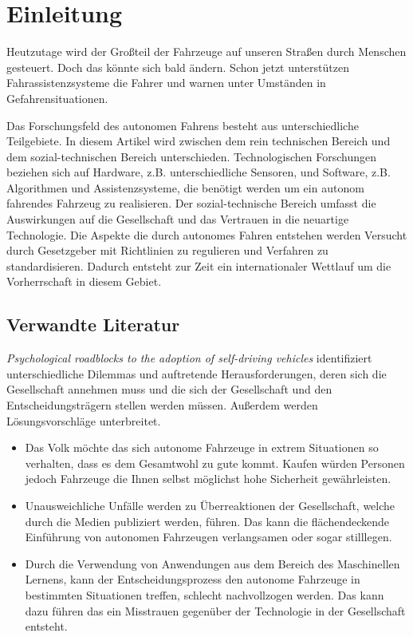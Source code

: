 \section{Einleitung}

Heutzutage wird der Großteil der Fahrzeuge auf unseren Straßen durch Menschen gesteuert. Doch das könnte sich bald ändern. Schon jetzt unterstützen Fahrassistenzsysteme die Fahrer und warnen unter Umständen in Gefahrensituationen.

Das Forschungsfeld des autonomen Fahrens besteht aus unterschiedliche Teilgebiete. In diesem Artikel wird  zwischen dem rein technischen Bereich und dem sozial-technischen Bereich unterschieden. Technologischen Forschungen beziehen sich auf Hardware, z.B. unterschiedliche Sensoren, und Software, z.B. Algorithmen und Assistenzsysteme, die benötigt werden um ein autonom fahrendes Fahrzeug zu realisieren. Der sozial-technische Bereich umfasst die Auswirkungen auf die Gesellschaft und das Vertrauen in die neuartige Technologie. Die Aspekte die durch autonomes Fahren entstehen werden Versucht durch Gesetzgeber mit Richtlinien zu regulieren und Verfahren zu standardisieren. Dadurch entsteht zur Zeit ein internationaler Wettlauf um die Vorherrschaft in diesem Gebiet.

\subsection{Verwandte Literatur}

\textit{Psychological roadblocks to the adoption of self-driving vehicles}  \cite{roadblocks} identifiziert unterschiedliche Dilemmas und auftretende Herausforderungen, deren sich die Gesellschaft annehmen muss und die sich der Gesellschaft und den Entscheidungsträgern stellen werden müssen. Außerdem werden Lösungsvorschläge unterbreitet.


\begin{itemize}
    \item Das Volk möchte das sich autonome Fahrzeuge in extrem Situationen so verhalten, dass es dem Gesamtwohl zu gute kommt. Kaufen würden Personen jedoch Fahrzeuge die Ihnen selbst möglichst hohe Sicherheit gewährleisten.
    \item Unausweichliche Unfälle werden zu Überreaktionen der Gesellschaft, welche durch die Medien publiziert werden, führen. Das kann die flächendeckende Einführung von autonomen Fahrzeugen verlangsamen oder sogar stilllegen.
    \item Durch die Verwendung von Anwendungen aus dem Bereich des Maschinellen Lernens, kann der Entscheidungsprozess den autonome Fahrzeuge in bestimmten Situationen treffen, schlecht nachvollzogen werden. Das kann dazu führen das ein Misstrauen gegenüber der Technologie in der Gesellschaft entsteht.
\end{itemize}


